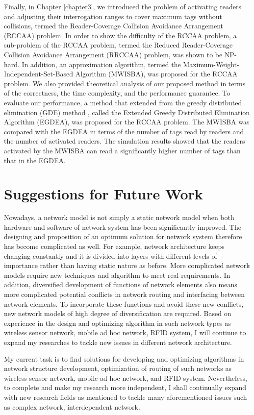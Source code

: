 Finally, in Chapter \ref{chapter3}, we introduced 
the problem of activating readers and
adjusting their interrogation ranges to cover maximum tags without
collisions, termed the Reader-Coverage Collision Avoidance
Arrangement (RCCAA) problem. In order to show the difficulty of the
RCCAA problem, a sub-problem of the RCCAA problem, termed the
Reduced Reader-Coverage Collision Avoidance Arrangement (RRCCAA)
problem, was shown to be NP-hard. In addition, an approximation
algorithm, termed the Maximum-Weight-Independent-Set-Based Algorithm
(MWISBA), was proposed for the RCCAA problem. We also provided
theoretical analysis of our proposed method in terms of the
correctness, the time complexity, and the performance guarantee.
To evaluate our performance, a method that extended from the greedy
distributed elimination (GDE) method \cite{related1}, called the
Extended Greedy Distributed Elimination Algorithm (EGDEA), was
proposed for the RCCAA problem. The MWISBA was compared with the
EGDEA in terms of the number of tags read by readers and the number
of activated readers. The simulation results showed that the readers
activated by the MWISBA can read a significantly higher number of
tags than that in the EGDEA.

\section{Suggestions for Future Work} \label{futurework}

Nowadays, a network model is not simply a static network model when both hardware
and software of network system has been significantly
improved. The designing and proposition of an optimum
solution for network system therefore has
become complicated as well. For example, network
architecture keeps changing constantly and it is divided
into layers with different levels of importance
rather than having static nature as before. More
complicated network models require new techniques
and algorithm to meet real requirements. In addition,
diversified development of functions of network
elements also means more complicated potential conflicts 
in network routing and interfacing between
network elements. To incorporate these functions
and avoid these new conflicts, new network models of
high degree of diversification are required. Based on
experience in the design and optimizing algorithm in
such network types as wireless sensor network, mobile
ad hoc network, RFID system, I will continue to
expand my researches to tackle new issues in different
network architecture.

My current task is to find solutions for developing
and optimizing algorithms in network structure development,
optimization of routing of such networks
as wireless sensor network, mobile ad hoc network,
and RFID system. Nevertheless, to complete and
make my research more independent, I shall continually
expand with new research fields as mentioned to
tackle many aforementioned issues such as complex network, interdependent network. 


